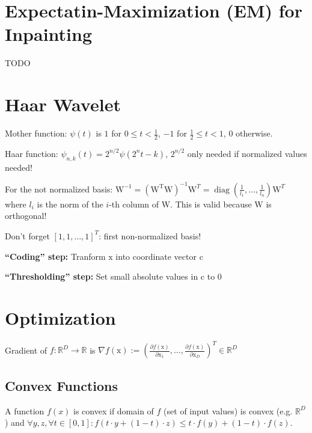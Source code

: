\documentclass[a4paper, 11pt, landscape]{article}
\newcommand{\matr}[1]{\boldsymbol{\mathrm{#1}}}
\begin{document}
\begin{multicols*}{3}
\section{Expectatin-Maximization (EM) for Inpainting}
TODO

\section{Haar Wavelet}
\begin{compactdesc}
	\item[Mother function:] $\psi(t)$ is $1$ for $0 \leq t < \frac{1}{2}$, $-1$ for $\frac{1}{2} \leq t < 1$, $0$ otherwise.
	\item[Haar function:] $\psi_{n,k}(t) = 2^{n/2} \psi(2^n t - k)$, $2^{n/2}$ only needed if normalized values needed!
\end{compactdesc}

\begin{compactitem}
	\item For the not normalized basis: $\matr{W}^{-1} = (\matr{W^T} \matr{W})^{-1} \matr{W}^T = \operatorname{diag}(\frac{1}{l_1}, \ldots, \frac{1}{l_n}) \matr{W}^T$ where $l_i$ is the norm of the $i$-th column of $\matr{W}$. This is valid because $\matr{W}$ is orthogonal!
	\item Don't forget $[1, 1, \ldots, 1]^T$: first non-normalized basis!
	\item \textbf{``Coding'' step:} Tranform $\matr{x}$ into coordinate vector $\matr{c}$
	\item \textbf{``Thresholding'' step:} Set small absolute values in $\matr{c}$ to $0$
\end{compactitem}

\section{Optimization}
Gradient of $f: \mathbb{R}^D \to \mathbb{R}$ is $\nabla f(\matr{x}) := \left( \frac{\partial f(\matr{x})}{\partial \matr{x}_1}, \ldots, \frac{\partial f(\matr{x})}{\partial \matr{x}_D} \right)^T \in \mathbb{R}^D$

\subsection{Convex Functions}
A function $f(x)$ is convex if domain of $f$ (set of input values) is convex (e.g. $\mathbb{R}^D$) and $\forall y, z, \forall t \in [0, 1]: f(t \cdot y + (1-t) \cdot z) \leq t \cdot f(y) + (1-t) \cdot f(z)$.


\end{multicols*}
\end{document}
